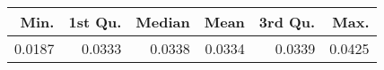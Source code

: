 \begin{table}[ht]
\centering
\begin{tabular}{rrrrrr}
  \hline
Min. & 1st Qu. & Median & Mean & 3rd Qu. & Max. \\ 
  \hline
0.0187 & 0.0333 & 0.0338 & 0.0334 & 0.0339 & 0.0425 \\ 
   \hline
\end{tabular}
\end{table}
